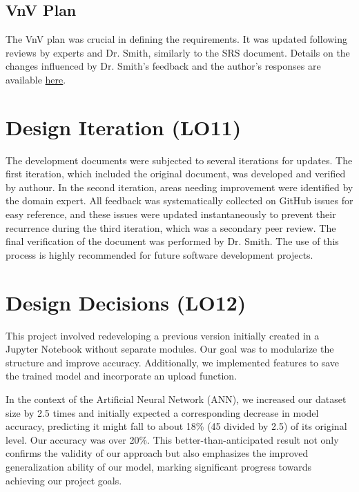 \documentclass{article}
\begin{document}
\subsection{VnV Plan}
The VnV plan was crucial in defining the requirements. It was updated 
following reviews by experts and Dr. Smith, similarly to the SRS document.
 Details on the changes influenced by Dr. Smith's feedback and the author's 
 responses are available \href{https://github.com/tanya-jp/ANN-CAS741/issues/13}{here}.

\section{Design Iteration (LO11)}

The development documents were subjected to several iterations for updates. 
The first iteration, which included the original document, was developed and verified by authour. 
In the second iteration, areas needing improvement were identified by the domain expert. 
All feedback was systematically collected on GitHub issues for easy reference, 
and these issues were updated instantaneously to prevent their recurrence during 
the third iteration, which was a secondary peer review. 
The final verification of the document was performed by Dr. Smith. 
The use of this process is highly recommended for future software development projects.


\section{Design Decisions (LO12)}


This project involved redeveloping a previous version initially created in a 
Jupyter Notebook without separate modules. Our goal was to modularize the structure 
and improve accuracy. Additionally, we implemented features to save the trained model 
and incorporate an upload function.

In the context of the Artificial Neural Network (ANN), we increased our dataset size by 
2.5 times and initially expected a corresponding decrease in model accuracy, predicting 
it might fall to about 18\% (45 divided by 2.5) of its original level.
Our accuracy was over 20\%. This better-than-anticipated 
result not only confirms the validity of our approach but also 
emphasizes the improved generalization ability of our model, marking 
significant progress towards achieving our project goals.

\end{document}
